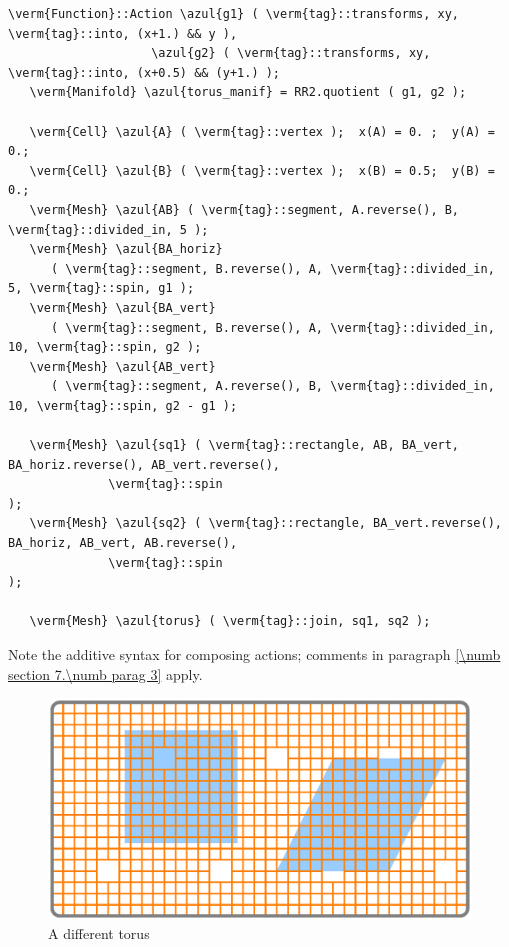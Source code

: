 \begin{Verbatim}[commandchars=\\\{\},formatcom=\small\tt,frame=single,
   label=parag-\ref{\numb section 7.\numb parag 8}.cpp,rulecolor=\color{coment},
   baselinestretch=0.94,framesep=2mm                                            ]
   \verm{Function}::Action \azul{g1} ( \verm{tag}::transforms, xy, \verm{tag}::into, (x+1.) && y ),
                    \azul{g2} ( \verm{tag}::transforms, xy, \verm{tag}::into, (x+0.5) && (y+1.) );
   \verm{Manifold} \azul{torus_manif} = RR2.quotient ( g1, g2 );

   \verm{Cell} \azul{A} ( \verm{tag}::vertex );  x(A) = 0. ;  y(A) = 0.;
   \verm{Cell} \azul{B} ( \verm{tag}::vertex );  x(B) = 0.5;  y(B) = 0.;
   \verm{Mesh} \azul{AB} ( \verm{tag}::segment, A.reverse(), B, \verm{tag}::divided_in, 5 );
   \verm{Mesh} \azul{BA_horiz}
      ( \verm{tag}::segment, B.reverse(), A, \verm{tag}::divided_in, 5, \verm{tag}::spin, g1 );
   \verm{Mesh} \azul{BA_vert}
      ( \verm{tag}::segment, B.reverse(), A, \verm{tag}::divided_in, 10, \verm{tag}::spin, g2 );
   \verm{Mesh} \azul{AB_vert}
      ( \verm{tag}::segment, A.reverse(), B, \verm{tag}::divided_in, 10, \verm{tag}::spin, g2 - g1 );

   \verm{Mesh} \azul{sq1} ( \verm{tag}::rectangle, AB, BA_vert, BA_horiz.reverse(), AB_vert.reverse(),
              \verm{tag}::spin                                                          );
   \verm{Mesh} \azul{sq2} ( \verm{tag}::rectangle, BA_vert.reverse(), BA_horiz, AB_vert, AB.reverse(),
              \verm{tag}::spin                                                          );

   \verm{Mesh} \azul{torus} ( \verm{tag}::join, sq1, sq2 );
\end{Verbatim}

Note the additive syntax for composing actions; comments in paragraph
\ref{\numb section 7.\numb parag 3} apply.

\begin{figure}[ht] \centering
  \includegraphics[width=120mm]{flat-torus-4.eps}
  \caption{A different torus}
  \label{\numb section 7.\numb fig 4}
\end{figure}

